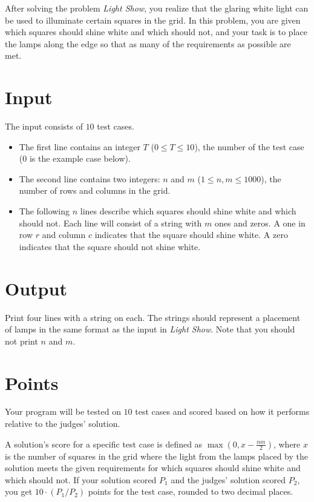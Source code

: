 \noindent
After solving the problem \textit{Light Show}, you realize that the glaring white light can be used to illuminate certain squares in the grid. In this problem, you are given which squares should shine white and which should not, and your task is to place the lamps along the edge so that as many of the requirements as possible are met.


\section*{Input}
The input consists of $10$ test cases.

\begin{itemize}
  \item 
    The first line contains an integer $T$ ($0 \leq T \leq 10$), the number of the test case ($0$ is the example case below).
  \item
    The second line contains two integers: $n$ and $m$ ($1 \le n, m \le 1000$), the number of rows and columns in the grid.
  \item
    The following $n$ lines describe which squares should shine white and which should not.
    Each line will consist of a string with $m$ ones and zeros. A one in row $r$ and column $c$ indicates that the square should shine white. A zero indicates that the square should not shine white.
\end{itemize}

\section*{Output}
Print four lines with a string on each. The strings should represent a placement of lamps in the same format as the input in \textit{Light Show}. 
Note that you should not print $n$ and $m$.

\section*{Points}
Your program will be tested on $10$ test cases and scored based on how it performs relative to the judges' solution.

A solution's score for a specific test case is defined as $\max(0, x - \frac{nm}{2})$, where $x$ is the number of squares in the grid where the light from the lamps placed by the solution meets the given requirements for which squares should shine white and which should not. If your solution scored $P_1$ and the judges' solution scored $P_2$, you get $10 \cdot (P_1 / P_2)$ points for the test case, rounded to two decimal places.

